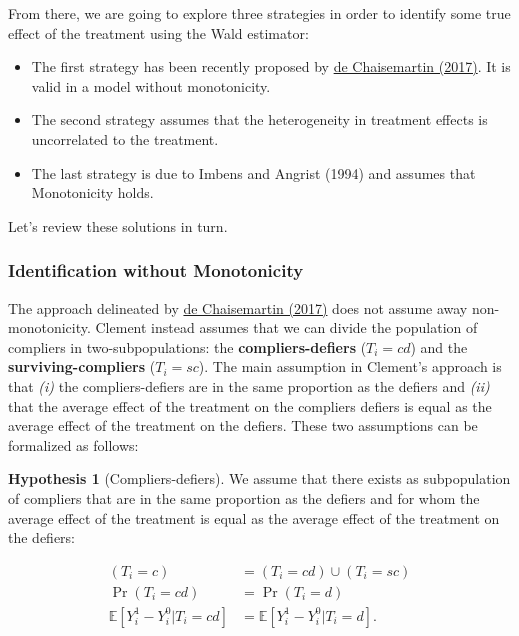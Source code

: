 \documentclass[
]{book}
\providecommand{\tightlist}{%
  \setlength{\itemsep}{0pt}\setlength{\parskip}{0pt}}
\newcommand{\esp}[1]{\mathbb{E}[ #1 ]}
\theoremstyle{definition}
\theoremstyle{definition}
\theoremstyle{definition}
\theoremstyle{definition}
\newtheorem{hypothesis}{Hypothesis}[chapter]
\theoremstyle{remark}
\begin{document}
From there, we are going to explore three strategies in order to identify some true effect of the treatment using the Wald estimator:

\begin{itemize}
\tightlist
\item
  The first strategy has been recently proposed by \href{https://drive.google.com/file/d/16XWlDECIvreM7l_NHe-JkXgyuPhFT1QG/view}{de Chaisemartin (2017)}.
  It is valid in a model without monotonicity.
\item
  The second strategy assumes that the heterogeneity in treatment effects is uncorrelated to the treatment.
\item
  The last strategy is due to Imbens and Angrist (1994) and assumes that Monotonicity holds.
\end{itemize}

Let's review these solutions in turn.

\hypertarget{identification-without-monotonicity}{%
\subsubsection{Identification without Monotonicity}\label{identification-without-monotonicity}}

The approach delineated by \href{https://drive.google.com/file/d/16XWlDECIvreM7l_NHe-JkXgyuPhFT1QG/view}{de Chaisemartin (2017)} does not assume away non-monotonicity.
Clement instead assumes that we can divide the population of compliers in two-subpopulations: the \textbf{compliers-defiers} (\(T_i=cd\)) and the \textbf{surviving-compliers} (\(T_i=sc\)).
The main assumption in Clement's approach is that \emph{(i)} the compliers-defiers are in the same proportion as the defiers and \emph{(ii)} that the average effect of the treatment on the compliers defiers is equal as the average effect of the treatment on the defiers.
These two assumptions can be formalized as follows:

\begin{hypothesis}[Compliers-defiers]
\protect\hypertarget{hyp:CD}{}{\label{hyp:CD} \iffalse (Compliers-defiers) \fi{} }We assume that there exists as subpopulation of compliers that are in the same proportion as the defiers and for whom the average effect of the treatment is equal as the average effect of the treatment on the defiers:

\begin{align*}
(T_i=c) & = (T_i=cd)\cup (T_i=sc) \\
\Pr(T_i=cd) & = \Pr(T_i=d) \\
\esp{Y^1_i-Y^0_i|T_i=cd} & = \esp{Y^1_i-Y^0_i|T_i=d}.
\end{align*}
\end{hypothesis}
\end{document}
